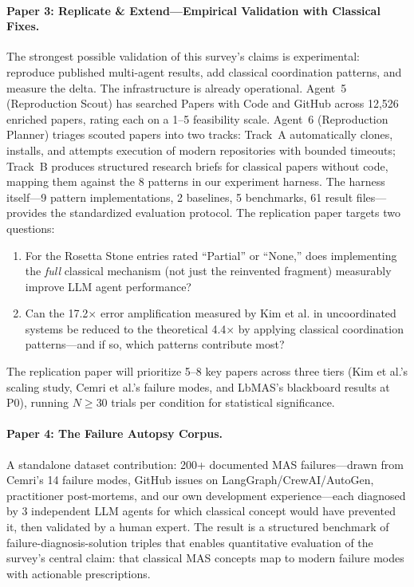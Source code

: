 \documentclass{article}
\begin{document}
\paragraph{Paper 3: Replicate \& Extend---Empirical Validation with Classical
Fixes.}
The strongest possible validation of this survey's claims is experimental: reproduce
published multi-agent results, add classical coordination patterns, and measure the
delta. The infrastructure is already operational. Agent~5 (Reproduction Scout) has
searched Papers with Code and GitHub across 12,526 enriched papers, rating each
on a 1--5 feasibility scale. Agent~6 (Reproduction Planner) triages scouted papers
into two tracks: Track~A automatically clones, installs, and attempts execution of
modern repositories with bounded timeouts; Track~B produces structured research
briefs for classical papers without code, mapping them against the 8 patterns in
our experiment harness. The harness itself---9 pattern implementations, 2 baselines,
5 benchmarks, 61 result files---provides the standardized evaluation protocol. The
replication paper targets two questions:
\begin{enumerate}[nosep]
  \item For the Rosetta Stone entries rated ``Partial'' or ``None,'' does
    implementing the \emph{full} classical mechanism (not just the reinvented
    fragment) measurably improve LLM agent performance?
  \item Can the 17.2$\times$ error amplification measured by Kim et al. in
    uncoordinated systems be reduced to the theoretical 4.4$\times$ by applying
    classical coordination patterns---and if so, which patterns contribute most?
\end{enumerate}
\noindent The replication paper will prioritize 5--8 key papers across three tiers
(Kim et al.'s scaling study, Cemri et al.'s failure modes, and LbMAS's blackboard
results at P0), running $N \geq 30$ trials per condition for statistical
significance.

\paragraph{Paper 4: The Failure Autopsy Corpus.}
A standalone dataset contribution: 200+ documented MAS failures---drawn from Cemri's
14 failure modes, GitHub issues on LangGraph/CrewAI/AutoGen, practitioner
post-mortems, and our own development experience---each diagnosed by 3 independent
LLM agents for which classical concept would have prevented it, then validated by a
human expert. The result is a structured benchmark of failure-diagnosis-solution
triples that enables quantitative evaluation of the survey's central claim: that
classical MAS concepts map to modern failure modes with actionable prescriptions.
\end{document}

